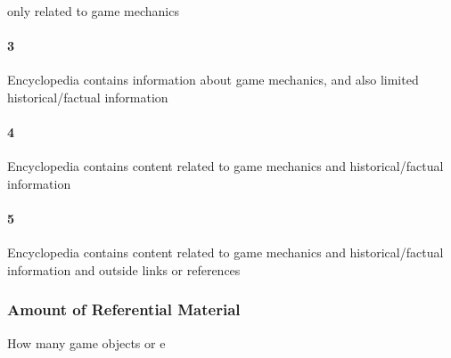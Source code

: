 only related to game mechanics\paragraph{3}Encyclopedia contains information about game mechanics, and also limited historical/factual information\paragraph{4}Encyclopedia contains content related to game mechanics and historical/factual information\paragraph{5}Encyclopedia contains content related to game mechanics and historical/factual information and outside links or references\subsubsection{Amount of Referential Material}How many game objects or e